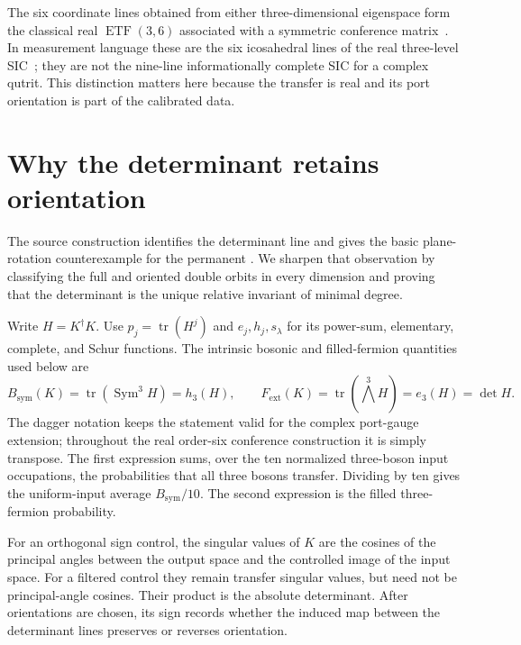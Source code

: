 \documentclass[11pt]{article}
\theoremstyle{remark}
\newcommand{\Sym}{\operatorname{Sym}}
\begin{document}
The six coordinate lines obtained from either three-dimensional eigenspace
form the classical real \(\operatorname{ETF}(3,6)\) associated with a symmetric
conference matrix~\cite{FickusMixon}.  In measurement language these are the
six icosahedral lines of the real three-level SIC~\cite{BengtssonZyczkowski};
they are not the nine-line informationally complete SIC for a complex qutrit.
This distinction matters here because the transfer is real and its port
orientation is part of the calibrated data.

\section{Why the determinant retains orientation}

The source construction identifies the determinant line and gives the basic
plane-rotation counterexample for the permanent
\cite[Section~5]{ClebschIII}.  We sharpen that observation by classifying the
full and oriented double orbits in every dimension and proving that the
determinant is the unique relative invariant of minimal degree.

Write \(H=K^\dagger K\).  Use \(p_j=\operatorname{tr}(H^j)\) and
\(e_j,h_j,s_\lambda\) for its power-sum, elementary, complete, and Schur
functions.  The intrinsic bosonic and filled-fermion quantities used below are
\[
 B_{\mathrm{sym}}(K)=\operatorname{tr}(\Sym^3 H)=h_3(H),
 \qquad
 F_{\mathrm{ext}}(K)=\operatorname{tr}(\bigwedge^3 H)
 =e_3(H)=\det H.
\]
The dagger notation keeps the statement valid for the complex port-gauge
extension; throughout the real order-six conference construction it is simply transpose.
The first expression sums, over the ten normalized three-boson input
occupations, the probabilities that all three bosons transfer.  Dividing by
ten gives the uniform-input average \(B_{\mathrm{sym}}/10\).  The second
expression is the filled three-fermion probability.

For an orthogonal sign control, the singular values of \(K\) are the cosines
of the principal angles between the output space and the controlled image of
the input space.  For a filtered control they remain transfer singular values,
but need not be principal-angle cosines.  Their product is the absolute
determinant.  After orientations are chosen, its sign records whether the
induced map between the determinant lines preserves or reverses orientation.
\end{document}
